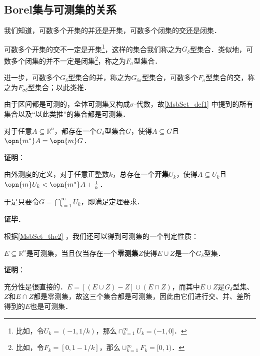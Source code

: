 
\subsection{Borel集与可测集的关系}

\begin{definition}{}

我们知道，可数多个开集的并还是开集，可数多个闭集的交还是闭集．

可数多个开集的交不一定是开集\footnote{比如，令$U_k=(-1, 1/k)$，那么$\cap_{k=1}^\infty U_k=(-1, 0]$．}，这样的集合我们称之为$G_\delta$型集合\cite{十一五实变函数论}．类似地，可数多个闭集的并不一定是闭集\footnote{比如，令$F_k=[0, 1-1/k]$，那么$\cup_{k=1}^\infty F_k=[0, 1)$．}，称之为$F_\sigma$型集合．

进一步，可数多个$G_\delta$型集合的并，称之为$G_{\delta\sigma}$型集合，可数多个$F_\sigma$型集合的交，称之为$F_{\sigma\delta}$型集合；以此类推．

\end{definition}

由于区间都是可测的，全体可测集又构成$\sigma$-代数，故\autoref{MsbSet_def1} 中提到的所有集合以及“以此类推”的集合都是可测集．




\begin{theorem}{}\label{MsbSet_the2}
对于任意$A\subseteq \mathbb{R}^n$，都存在一个$G_\delta$型集合$G$，使得$A\subseteq G$且$\opn{m^*}A=\opn{m}G$．
\end{theorem}

\textbf{证明}：

由外测度的定义，对于任意正整数$k$，总存在一个\textbf{开集}$U_k$，使得$A\subseteq U_k$且$\opn{m}U_k<\opn{m^*}A+\frac{1}{k}$．

于是只要令$G=\bigcap_{i=1}^\infty U_k$，即满足定理要求．

\textbf{证毕}．








根据\autoref{MsbSet_the2} ，我们还可以得到可测集的一个判定性质：

\begin{theorem}{}\label{MsbSet_the3}
$E\subseteq \mathbb{R}^n$是可测集，当且仅当存在一个\textbf{零测集}$Z$使得$E\cup Z$是一个$G_\delta$型集．
\end{theorem}

\textbf{证明}：

充分性是很直接的．$E=[(E\cup Z)-Z]\cup(E\cap Z)$，而其中$E\cup Z$是$G_\delta$型集、$Z$和$E\cap Z$都是零测集，故这三个集合都是可测集，因此由它们进行交、并、差所得到的$E$也是可测集．

